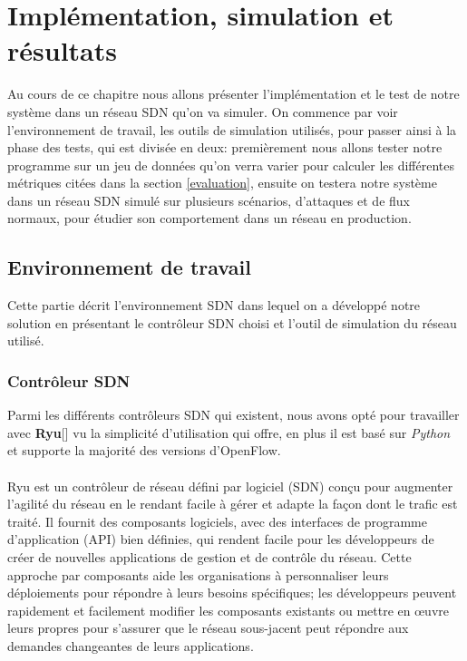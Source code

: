 \chapter{Implémentation, simulation et résultats}

\label{Chapter5}
Au cours de ce chapitre nous allons présenter l'implémentation et le test de notre système dans un réseau SDN qu'on va simuler. On commence par voir l'environnement de travail, les outils de simulation utilisés, pour passer ainsi à la phase des tests, qui est divisée en deux: premièrement nous allons tester notre programme sur un jeu de données qu'on verra varier pour calculer les différentes métriques citées dans la section \ref{evaluation}, ensuite on testera notre système dans un réseau SDN simulé sur plusieurs scénarios, d'attaques et de flux normaux, pour étudier son comportement dans un réseau en production.

\section{Environnement de travail}
Cette partie décrit l'environnement SDN dans lequel on a développé notre solution en présentant le contrôleur SDN choisi et l'outil de simulation du réseau utilisé.

\subsection{Contrôleur SDN}
Parmi les différents contrôleurs SDN qui existent, nous avons opté pour travailler avec \textbf{Ryu}[\cite{4}] vu la simplicité d'utilisation qui offre, en plus il est basé sur \textit{Python} et supporte la majorité des versions d’OpenFlow. \\\\
Ryu est un contrôleur de réseau défini par logiciel (SDN) conçu pour augmenter l’agilité du réseau en le rendant facile à gérer et adapte la façon dont le trafic est traité. Il fournit des composants logiciels, avec des interfaces de programme d’application (API) bien définies, qui rendent facile pour les développeurs de créer de nouvelles applications de gestion et de contrôle du réseau. Cette approche par composants aide les organisations à personnaliser leurs déploiements pour répondre à leurs besoins spécifiques; les développeurs peuvent rapidement et facilement modifier les composants existants ou mettre en œuvre leurs propres pour s’assurer que le réseau sous-jacent peut répondre aux demandes changeantes de leurs applications.\\

